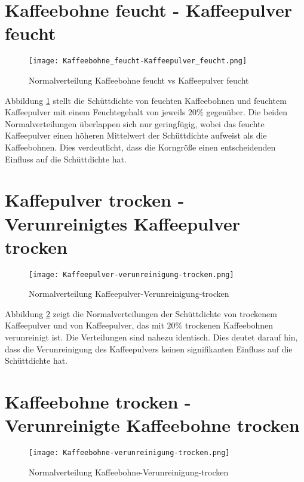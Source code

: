 \section{Kaffeebohne feucht - Kaffeepulver feucht}
 \begin{figure}[H]
    \centering
    \texttt{[image: Kaffeebohne\_feucht-Kaffeepulver\_feucht.png]}
    \caption{Normalverteilung Kaffeebohne feucht vs Kaffeepulver feucht}
    \label{fig: Norm.Kaffeebohne_feucht-Kaffeepulver_feucht}
\end{figure}

Abbildung \ref{fig: Norm.Kaffeebohne_feucht-Kaffeepulver_feucht} stellt die Schüttdichte von feuchten Kaffeebohnen und feuchtem Kaffeepulver mit einem Feuchtegehalt von jeweils $20\%$ gegenüber.
Die beiden Normalverteilungen überlappen sich nur geringfügig, wobei das feuchte Kaffeepulver einen höheren 
Mittelwert der Schüttdichte aufweist als die Kaffeebohnen. Dies verdeutlicht, dass die Korngröße einen entscheidenden 
Einfluss auf die Schüttdichte hat.

\section{Kaffepulver trocken - Verunreinigtes Kaffeepulver trocken}
 \begin{figure}[H]
    \centering
    \texttt{[image: Kaffeepulver-verunreinigung-trocken.png]}
    \caption{Normalverteilung Kaffeepulver-Verunreinigung-trocken}
    \label{fig: Norm.Kaffeepulver-verunreinigung-trocken}
\end{figure}

Abbildung \ref{fig: Norm.Kaffeepulver-verunreinigung-trocken} zeigt die Normalverteilungen der Schüttdichte von trockenem Kaffeepulver und von Kaffeepulver, 
das mit $20\%$ trockenen Kaffeebohnen verunreinigt ist. Die Verteilungen sind nahezu identisch. Dies deutet darauf hin, 
dass die Verunreinigung des Kaffeepulvers keinen signifikanten Einfluss auf die Schüttdichte hat.

\section{Kaffeebohne trocken - Verunreinigte Kaffeebohne trocken}
 \begin{figure}[H]
    \centering
    \texttt{[image: Kaffeebohne-verunreinigung-trocken.png]}
    \caption{Normalverteilung Kaffeebohne-Verunreinigung-trocken}
    \label{fig: Norm.Kaffeebohne-verunreinigung-trocken}
\end{figure}

